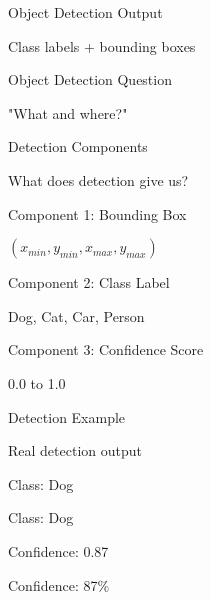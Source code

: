 \documentclass[usenames,dvipsnames]{beamer}
\begin{document}
	\begin{frame}{Object Detection Output}
		\begin{center}
		\Large Class labels + bounding boxes
		\end{center}
	\end{frame}
	
	\begin{frame}{Object Detection Question}
		\begin{center}
		\Large "What and where?"
		\end{center}
	\end{frame}
	
	\begin{frame}{Detection Components}
		\begin{center}
		\Large What does detection give us?
		\end{center}
	\end{frame}
	
	\begin{frame}{Component 1: Bounding Box}
		\begin{center}
		\Large $(x_{min}, y_{min}, x_{max}, y_{max})$
		\end{center}
	\end{frame}
	
	\begin{frame}{Component 2: Class Label}
		\begin{center}
		\Large Dog, Cat, Car, Person
		\end{center}
	\end{frame}
	
	\begin{frame}{Component 3: Confidence Score}
		\begin{center}
		\Large 0.0 to 1.0
		\end{center}
	\end{frame}
	
	\begin{frame}{Detection Example}
		\begin{center}
		\Large Real detection output
		\end{center}
	\end{frame}
	
	\begin{frame}{Class: Dog}
		\begin{center}
		\Large Class: Dog
		\end{center}
	\end{frame}
	
	\begin{frame}{Confidence: 0.87}
		\begin{center}
		\Large Confidence: 87\%
		\end{center}
	\end{frame}
	
\end{document}
